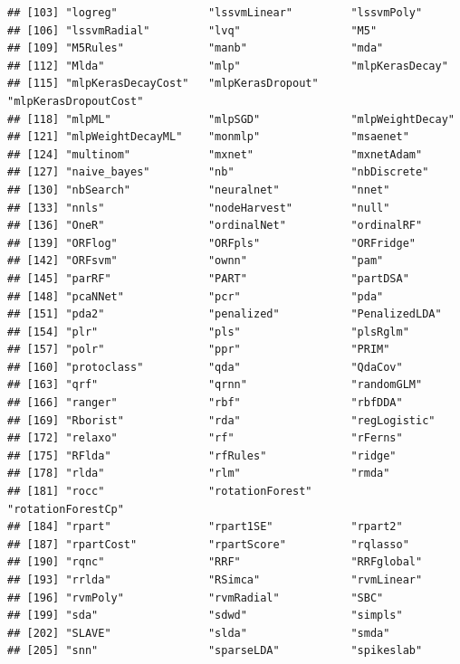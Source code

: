 \documentclass[]{book}
\theoremstyle{break}
\theoremstyle{definition}
\theoremstyle{definition}
\theoremstyle{definition}
\theoremstyle{remark}
\begin{document}
\begin{verbatim}
## [103] "logreg"              "lssvmLinear"         "lssvmPoly"          
## [106] "lssvmRadial"         "lvq"                 "M5"                 
## [109] "M5Rules"             "manb"                "mda"                
## [112] "Mlda"                "mlp"                 "mlpKerasDecay"      
## [115] "mlpKerasDecayCost"   "mlpKerasDropout"     "mlpKerasDropoutCost"
## [118] "mlpML"               "mlpSGD"              "mlpWeightDecay"     
## [121] "mlpWeightDecayML"    "monmlp"              "msaenet"            
## [124] "multinom"            "mxnet"               "mxnetAdam"          
## [127] "naive_bayes"         "nb"                  "nbDiscrete"         
## [130] "nbSearch"            "neuralnet"           "nnet"               
## [133] "nnls"                "nodeHarvest"         "null"               
## [136] "OneR"                "ordinalNet"          "ordinalRF"          
## [139] "ORFlog"              "ORFpls"              "ORFridge"           
## [142] "ORFsvm"              "ownn"                "pam"                
## [145] "parRF"               "PART"                "partDSA"            
## [148] "pcaNNet"             "pcr"                 "pda"                
## [151] "pda2"                "penalized"           "PenalizedLDA"       
## [154] "plr"                 "pls"                 "plsRglm"            
## [157] "polr"                "ppr"                 "PRIM"               
## [160] "protoclass"          "qda"                 "QdaCov"             
## [163] "qrf"                 "qrnn"                "randomGLM"          
## [166] "ranger"              "rbf"                 "rbfDDA"             
## [169] "Rborist"             "rda"                 "regLogistic"        
## [172] "relaxo"              "rf"                  "rFerns"             
## [175] "RFlda"               "rfRules"             "ridge"              
## [178] "rlda"                "rlm"                 "rmda"               
## [181] "rocc"                "rotationForest"      "rotationForestCp"   
## [184] "rpart"               "rpart1SE"            "rpart2"             
## [187] "rpartCost"           "rpartScore"          "rqlasso"            
## [190] "rqnc"                "RRF"                 "RRFglobal"          
## [193] "rrlda"               "RSimca"              "rvmLinear"          
## [196] "rvmPoly"             "rvmRadial"           "SBC"                
## [199] "sda"                 "sdwd"                "simpls"             
## [202] "SLAVE"               "slda"                "smda"               
## [205] "snn"                 "sparseLDA"           "spikeslab"          

\end{verbatim}
\end{document}

